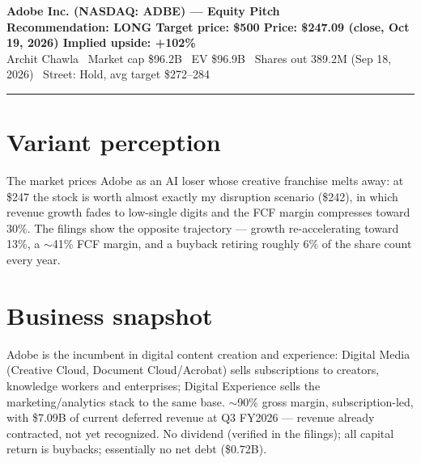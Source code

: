 \documentclass[9pt]{extarticle}
\begin{document}
\begin{center}
{\LARGE\bfseries\color{navy} Adobe Inc. (NASDAQ: ADBE) --- Equity Pitch}\\[2pt]
{\large\bfseries Recommendation: LONG \quad Target price: \$500 \quad Price: \$247.09 (close, Oct 19, 2026) \quad Implied upside: +102\%}\\[2pt]
Archit Chawla \textbar\ Market cap \$96.2B \textbar\ EV \$96.9B \textbar\ Shares out 389.2M (Sep 18, 2026) \textbar\ Street: Hold, avg target \$272--284
\end{center}
\vspace{-4pt}
\hrule
\vspace{2pt}

\section*{Variant perception}
The market prices Adobe as an AI loser whose creative franchise melts away: at \$247 the stock is worth almost exactly my disruption scenario (\$242), in which revenue growth fades to low-single digits and the FCF margin compresses toward 30\%. The filings show the opposite trajectory --- growth re-accelerating toward 13\%, a $\sim$41\% FCF margin, and a buyback retiring roughly 6\% of the share count every year.

\section*{Business snapshot}
Adobe is the incumbent in digital content creation and experience: Digital Media (Creative Cloud, Document Cloud/Acrobat) sells subscriptions to creators, knowledge workers and enterprises; Digital Experience sells the marketing/analytics stack to the same base. $\sim$90\% gross margin, subscription-led, with \$7.09B of current deferred revenue at Q3 FY2026 --- revenue already contracted, not yet recognized. No dividend (verified in the filings); all capital return is buybacks; essentially no net debt (\$0.72B).
\end{document}
